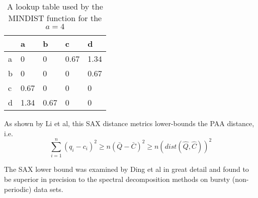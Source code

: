 \begin{table}
\begin{tabularx}{400pt}{X X X X X}
\hline
   & a   & b    & c    & d    \\
\hline
a & 0    & 0    & 0.67 & 1.34 \\
b & 0    & 0    & 0    & 0.67 \\
c & 0.67 & 0    & 0    & 0    \\
d & 1.34 & 0.67 & 0    & 0    \\
\hline
\end{tabularx}
\caption{A lookup table used by the MINDIST function for the $a=4$}
\label{tbl:sax_lookup}
\end{table}

As shown by Li et al, this SAX distance metrics lower-bounds the PAA distance, i.e.
\begin{equation}
\sum_{i=1}^{n} (q_{i} - c_{i})^{2} \geq n(\bar{Q} - \bar{C})^{2} \geq n(dist(\hat{Q},\hat{C}))^2
\label{eq:sax_bounding}
\end{equation}

The SAX lower bound was examined by Ding et al \cite{citeulike:4501572} in great detail and found to be superior in precision to the spectral decomposition methods on bursty (non-periodic) data sets.
